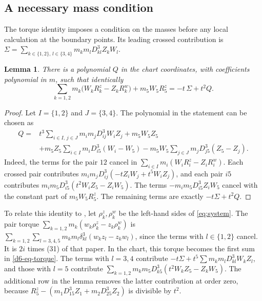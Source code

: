 \documentclass[11pt]{amsart}
\newtheorem{lemma}[theorem]{Lemma}
\theoremstyle{definition}
\theoremstyle{remark}
\begin{document}
\subsection{A necessary mass condition}

{
The torque identity imposes a condition on the masses before any local
calculation at the boundary points.  Its leading crossed contribution is
$\Sigma=\sum_{k\in\{1,2\},\,l\in\{3,4\}}m_km_lD_{kl}^3Z_kW_l$.
}

{\begin{lemma}\label{d6-lem-torque}
There is a polynomial $Q$ in the chart coordinates, with coefficients polynomial in $m$, such
that identically
\begin{equation}\label{d6-eq-torque}
  \sum_{k=1,2}m_k\bigl(W_kR^z_k-Z_kR^w_k\bigr)+m_5W_5R^z_5=-t\,\Sigma+t^2Q.
\end{equation}
\end{lemma}}
{\begin{proof}
Let $I=\{1,2\}$ and $J=\{3,4\}$. The polynomial in the statement can be chosen as
\begin{align*}
Q={}&t^3\sum_{i\in I,\,j\in J}m_im_jD_{ij}^3W_iZ_j
 +m_5W_5Z_5\\
&+m_5Z_5\sum_{i\in I}m_iD_{i5}^3(W_i-W_5)
 -m_5W_5\sum_{j\in J}m_jD_{j5}^3(Z_5-Z_j).
\end{align*}
Indeed, the terms for the pair $12$ cancel in
$\sum_{i\in I}m_i(W_iR_i^z-Z_iR_i^w)$.
Each crossed pair contributes
$m_im_jD_{ij}^3(-tZ_iW_j+t^5W_iZ_j)$,
and each pair $i5$ contributes
$m_im_5D_{i5}^3(t^2W_iZ_5-Z_iW_5)$.
The terms $-m_im_5D_{i5}^3Z_iW_5$ cancel with the constant part of
$m_5W_5R_5^z$. The remaining terms are exactly $-t\Sigma+t^2Q$.
\end{proof}

}{
To relate this identity to \cite[\S8.6]{AK}, let $\rho^z_k,\rho^w_k$ be
the left-hand sides of \eqref{eq:system}.  The pair torque
$\sum_{k=1,2}m_k(w_k\rho^z_k-z_k\rho^w_k)$ is
$\sum_{k=1,2}\sum_{l=3,4,5}m_km_l\delta_{kl}^3(w_kz_l-z_kw_l)$,
since the terms with $l\in\{1,2\}$ cancel.  It is $2i$ times (31) of that paper.
In the chart, this torque becomes the first sum in \eqref{d6-eq-torque}.
The terms with $l=3,4$ contribute $-t\Sigma+t^5\sum m_km_lD_{kl}^3W_kZ_l$,
and those with $l=5$ contribute
$\sum_{k=1,2}m_km_5D_{k5}^3(t^2W_kZ_5-Z_kW_5)$.
The additional row in the lemma removes the latter contribution at order
zero, because $R^z_5-(m_1D_{15}^3Z_1+m_2D_{25}^3Z_2)$ is divisible by $t^2$.
}
\end{document}
